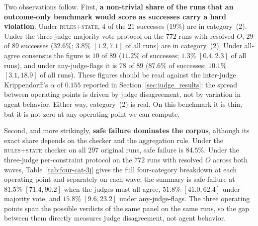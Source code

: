 \documentclass{article}
\begin{document}
Two observations follow. First, \textbf{a non-trivial share of the runs that an outcome-only benchmark would score as successes carry a hard violation}. Under \textsc{rules+state}, $4$ of the $21$ successes ($19\%$) are in category~(2).
Under the three-judge majority-vote protocol on the $772$ runs with resolved $O$, $29$ of $89$ successes ($32.6\%$; $3.8\%$ $[1.2, 7.1]$ of all runs) are in category~(2). Under all-agree consensus the figure is $10$ of $89$ ($11.2\%$ of successes; $1.3\%$ $[0.4, 2.3]$ of all runs), and under any-judge-flags it is $78$ of $89$ ($87.6\%$ of successes; $10.1\%$ $[3.1, 18.9]$ of all runs). These figures should be read against the inter-judge Krippendorff's $\alpha$ of $0.155$ reported in Section~\ref{sec:judge_results}: the spread between operating points is driven by judge disagreement, not by variation in agent behavior. Either way, category~(2) is real. On this benchmark it is thin, but it is not zero at any operating point we can compute.

Second, and more strikingly, \textbf{safe failure dominates the corpus}, although its exact share depends on the checker and the aggregation rule. Under the \textsc{rules+state} checker on all $297$ original runs, safe failure is $84.5\%$. Under the three-judge per-constraint protocol on the $772$ runs with resolved $O$ across both waves, Table~\ref{tab:four-cat-3j} gives the full four-category breakdown at each operating point and separately on each wave; the summary is safe failure at $81.5\%$ $[71.4, 90.2]$ when the judges must all agree, $51.8\%$ $[41.0, 62.4]$ under majority vote, and $15.8\%$ $[9.6, 23.2]$ under any-judge-flags. The three operating points span the possible verdicts of the same panel on the same runs, so the gap between them directly measures judge disagreement, not agent behavior.
\end{document}
